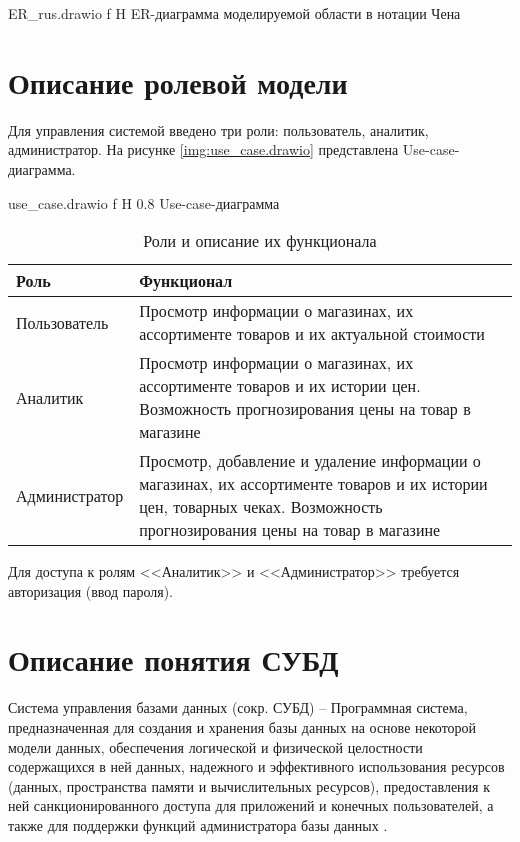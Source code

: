\documentclass{bmstu}
\begin{document}
	{ER_rus.drawio}
	{f}
	{H}
	{\textwidth}
	{ER-диаграмма моделируемой области в нотации Чена}

\section{Описание ролевой модели}

Для управления системой введено три роли: пользователь, аналитик, администратор. На рисунке \ref{img:use_case.drawio} представлена Use-case-диаграмма.

	{use_case.drawio}
	{f}
	{H}
	{0.8\textwidth}
	{Use-case-диаграмма}


\begin{table}[H]
	\caption{Роли и описание их функционала}
	\begin{center}
		\begin{tabular}{| l | p{12 cm} |} 
			\hline
			
			\textbf{Роль} & \textbf{Функционал} \\  
			
			\hline
			
			Пользователь & Просмотр информации о магазинах, их ассортименте товаров и их актуальной стоимости \\
			
			\hline
			
			Аналитик & Просмотр информации о магазинах, их ассортименте товаров и их истории цен. Возможность прогнозирования цены на товар в магазине \\
			
			\hline
			
			Администратор & Просмотр, добавление и удаление информации о магазинах, их ассортименте товаров и их истории цен, товарных чеках. Возможность прогнозирования цены на товар в магазине \\
			
			\hline
		\end{tabular}
	\end{center}
\end{table}



Для доступа к ролям <<Аналитик>> и <<Администратор>> требуется авторизация (ввод пароля).

\section{Описание понятия СУБД}

Система управления базами данных (сокр. СУБД) -- Программная система, предназначенная для создания и хранения базы данных на основе некоторой модели данных, обеспечения логической и физической целостности содержащихся в ней данных, надежного и эффективного использования ресурсов (данных, пространства памяти и вычислительных ресурсов), предоставления к ней санкционированного доступа для приложений и конечных пользователей, а также для поддержки 
функций администратора базы данных \cite{kogal}.
\end{document}
